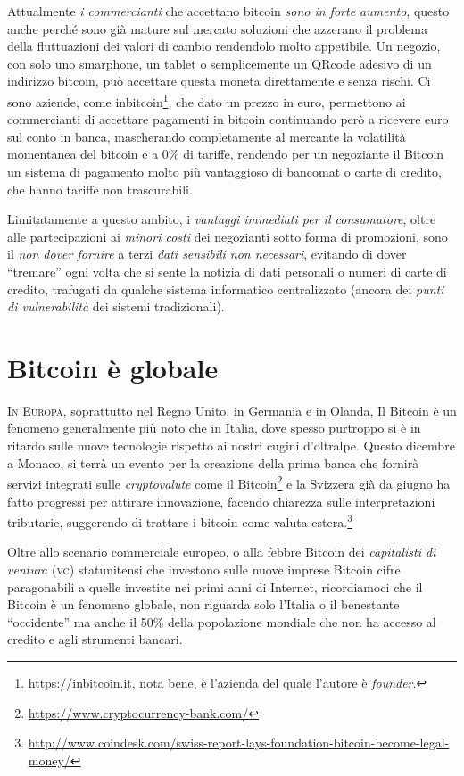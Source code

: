 \documentclass[a4paper,12pt,italian]{article}
\begin{document}
\bigskip

Attualmente \emph{i commercianti} che accettano bitcoin \emph{sono in forte aumento},
questo anche perché sono già mature sul mercato soluzioni che azzerano
il problema della fluttuazioni dei valori di cambio rendendolo molto
appetibile. Un negozio, con solo uno smarphone, un tablet o
semplicemente un QRcode adesivo di un indirizzo bitcoin, può accettare
questa moneta direttamente e senza rischi. Ci sono aziende, come
inbitcoin\footnote{\url{https://inbitcoin.it}, nota bene, è l'azienda del quale l'autore è \emph{founder}.}, che dato un prezzo in euro,
permettono ai commercianti di accettare pagamenti in bitcoin
continuando però a ricevere euro sul conto in banca, mascherando
completamente al mercante la volatilità momentanea del bitcoin e a 0\%
di tariffe, rendendo per un negoziante il Bitcoin un sistema di pagamento 
molto più vantaggioso di bancomat o carte di credito, che hanno tariffe non
trascurabili.

Limitatamente a questo ambito, i \emph{vantaggi immediati per il consumatore}, oltre alle partecipazioni ai \emph{minori costi}
dei negozianti sotto forma di promozioni, sono il \emph{non dover fornire} a terzi \emph{dati sensibili non 
necessari}, evitando di dover ``tremare'' ogni volta che si sente la notizia di dati personali o numeri di carte di credito, trafugati
da qualche sistema informatico centralizzato (ancora dei \emph{punti di vulnerabilità} dei sistemi tradizionali).


\section*{Bitcoin è globale}


\lettrine{I}{n Europa}, soprattutto nel Regno Unito, in Germania e in Olanda,
Il Bitcoin è un fenomeno generalmente più noto che in Italia, 
dove spesso purtroppo si è in ritardo sulle nuove tecnologie rispetto ai nostri cugini d'oltralpe.
Questo dicembre a Monaco, si terrà un evento per la creazione della prima banca che fornirà servizi integrati sulle
\emph{cryptovalute} come il Bitcoin\footnote{\url{https://www.cryptocurrency-bank.com/}} e la Svizzera  già da giugno ha fatto progressi per 
attirare innovazione, facendo chiarezza sulle interpretazioni tributarie, suggerendo di trattare
i bitcoin come valuta estera.\footnote{\url{http://www.coindesk.com/swiss-report-lays-foundation-bitcoin-become-legal-money/}}

Oltre allo scenario commerciale europeo, o alla febbre Bitcoin dei \emph{capitalisti di ventura} (\textsc{vc}) statunitensi che investono sulle nuove imprese Bitcoin cifre paragonabili
a quelle investite nei primi anni di Internet, ricordiamoci che il Bitcoin è un fenomeno globale, non riguarda solo l’Italia o il
benestante “occidente” ma anche il 50\% della popolazione mondiale che
non ha accesso al credito e agli strumenti bancari.
\end{document}
